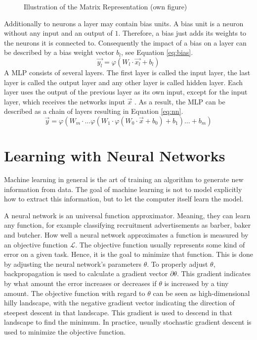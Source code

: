 		\begin{figure}[H]
			\centering
			
			\caption{Illustration of the Matrix Representation (own figure)} \label{fig:nn_matrix}
		\end{figure}
		\par
		Additionally to neurons a layer may contain bias units. A bias unit is a neuron without any input and an output of $1$. Therefore, a bias just adds its weights to the neurons it is connected to. Consequently the impact of a bias on a layer can be described by a bias weight vector $b_l$, see Equation \eqref{eq:bias}.
		\begin{equation}
			\label{eq:bias}
			\vec{y_l} = \varphi(W_l \cdot \vec{x_l} + b_l)
		\end{equation}
		A \ac{MLP} consists of several layers. The first layer is called the input layer, the last layer is called the output layer and any other layer is called hidden layer. Each layer uses the output of the previous layer as its own input, except for the input layer, which receives the networks input $\vec{x}$ .\autocite{Svozil.1997} As a result, the \ac{MLP} can be described as a chain of layers resulting in Equation \eqref{eq:nn}.
		\begin{equation}
			\label{eq:nn}
			\vec{y} = \varphi(W_m \cdot \dots\varphi(W_1 \cdot \varphi(W_0 \cdot \vec{x} + b_0) + b_1)\dots + b_m)
		\end{equation}
			
	\section{Learning with Neural Networks}
		Machine learning in general is the art of training an algorithm to generate new information from data. The goal of machine learning is not to model explicitly how to extract this information, but to let the computer itself learn the model. \autocite{Mohri.2012}
		\par
		A neural network is an universal function approximator.\autocite{Hornik.1989} Meaning, they can learn any function, for example classifying recruitment advertisements as barber, baker and butcher. How well a neural network approximates a function is measured by an objective function $\mathcal{L}$. The objective function usually represents some kind of error on a given task. Hence, it is the goal to minimize that function. This is done by adjusting the neural network's parameters $\theta$. To properly adjust $\theta$, backpropagation \autocite{Rumelhart.1986} is used to calculate a gradient vector $\partial \theta$. This gradient indicates by what amount the error increases or decreases if $\theta$ is increased by a tiny amount. The objective function with regard to $\theta$ can be seen as high-dimensional hilly landscape, with the negative gradient vector indicating the direction of steepest descent in that landscape. This gradient is used to descend in that landscape to find the minimum. In practice, usually stochastic gradient descent is used to minimize the objective function. \autocite{LeCun.2015}
